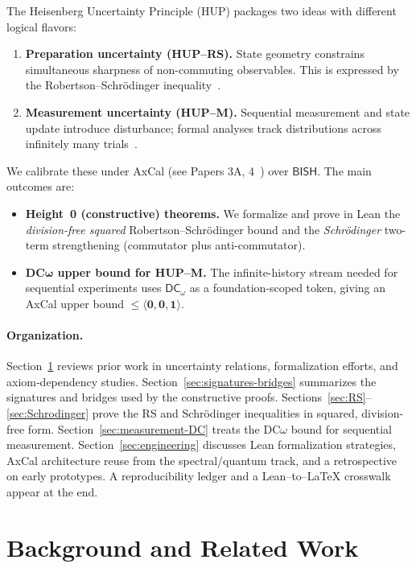 \documentclass[11pt]{article}
\newcommand{\DCw}{\mathsf{DC}_{\omega}}
\newcommand{\BISH}{\mathsf{BISH}}
\newcommand{\hzero}{\mathbf{0}}
\newcommand{\hone}{\mathbf{1}}
\newcommand{\DCwonly}{\langle \hzero,\hzero,\hone\rangle}
\theoremstyle{plain}
\theoremstyle{definition}
\theoremstyle{remark}
\begin{document}
The Heisenberg Uncertainty Principle (HUP) packages two ideas with different logical flavors:
\begin{enumerate}
\item \textbf{Preparation uncertainty (HUP--RS).} State geometry constrains simultaneous sharpness of non-commuting observables. This is expressed by the Robertson--Schrödinger inequality~\cite{Robertson1929,Schrodinger1930}.
\item \textbf{Measurement uncertainty (HUP--M).} Sequential measurement and state update introduce disturbance; formal analyses track distributions across infinitely many trials~\cite{BuschLahtiWerner2014,Ozawa2003}.
\end{enumerate}
We calibrate these under AxCal (see Papers 3A, 4~\cite{Paper3A,Paper4}) over $\BISH$. The main outcomes are:
\begin{itemize}
\item \textbf{Height~0 (constructive) theorems.} We formalize and prove in Lean the \emph{division-free squared} Robertson--Schrödinger bound and the \emph{Schrödinger} two-term strengthening (commutator plus anti-commutator).
\item \textbf{DC$\boldsymbol{\omega}$ upper bound for HUP--M.} The infinite-history stream needed for sequential experiments uses $\DCw$ as a foundation-scoped token, giving an AxCal upper bound $\le \DCwonly$.
\end{itemize}

\paragraph{Organization.}
Section~\ref{sec:related} reviews prior work in uncertainty relations, formalization efforts, and axiom‑dependency studies.
Section~\ref{sec:signatures-bridges} summarizes the signatures and bridges used by the constructive proofs.
Sections~\ref{sec:RS}--\ref{sec:Schrodinger} prove the RS and Schrödinger inequalities in squared, division-free form.
Section~\ref{sec:measurement-DC} treats the DC$\omega$ bound for sequential measurement.
Section~\ref{sec:engineering} discusses Lean formalization strategies, AxCal architecture reuse from the spectral/quantum track, and a retrospective on early prototypes.
A reproducibility ledger and a Lean--to--LaTeX crosswalk appear at the end.

\section{Background and Related Work}
\label{sec:related}
\end{document}
